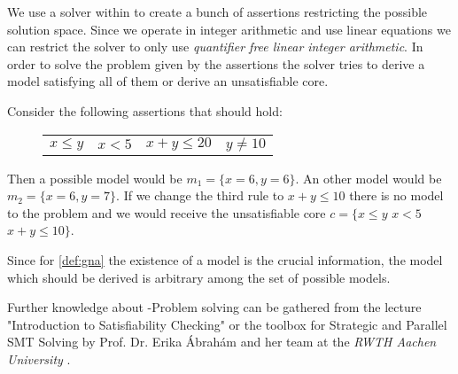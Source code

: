 We use a solver within \aprove to create a bunch of assertions restricting the possible solution space. Since we operate in integer arithmetic and use linear equations we can restrict the solver to only use \textit{quantifier free linear integer arithmetic}. In order to solve the problem given by the assertions the solver tries to derive a model satisfying all of them or derive an unsatisfiable core. \cite{sat2016}\newline

\begin{example}
	Consider the following assertions that should hold:\newline
	\vspace{-1em}
	\begin{figure}[H]
		\centering
		\begin{tabular}{cccc}
			$x \le y$ &	$x  < 5 $ &	$ x+ y \le 20$ &$y \neq 10$ \\
		\end{tabular}
	\end{figure}
	\vspace{-1em}
	Then a possible model would be $m_1 = \{x=6, y=6\}$. An other model would be $m_2 = \{x=6, y=7\}$. If we change the third rule to $x+y\le 10$ there is no model to the problem and we would receive the unsatisfiable core $c= \{x \le y$ $x  < 5$ $x+ y \le 10 \}$.
\end{example}

Since for \autoref{def:gna} the existence of a model is the crucial information, the model which should be derived is arbitrary among the set of possible models.

Further knowledge about -Problem solving can be gathered from the lecture "Introduction to Satisfiability Checking" or the  toolbox for Strategic and Parallel SMT Solving by Prof. Dr. Erika Ábrahám and her team at the \textit{RWTH Aachen University} \cite{corzilius2015smt}.
